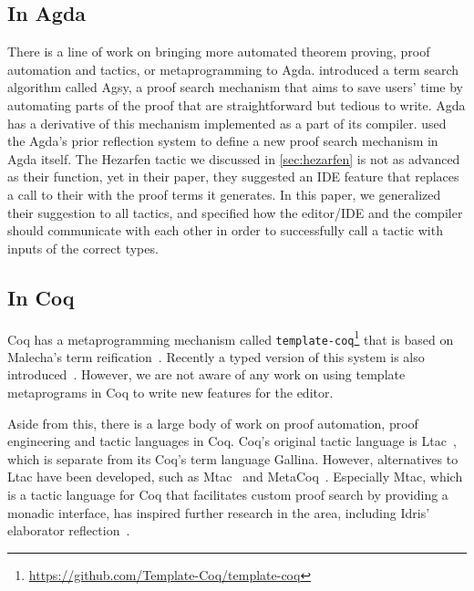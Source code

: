 \subsection{In Agda}

There is a line of work on bringing more automated theorem proving,
proof automation and tactics, or metaprogramming to Agda.
\citet{agsy} introduced a term search algorithm called
Agsy, a proof search mechanism that aims to save users' time by automating
parts of the proof that are straightforward but tedious to write.
Agda has a derivative of this mechanism implemented as a part of its compiler.
\citet{autoinagda} used the Agda's prior reflection system to define a
new proof search mechanism in Agda itself.
The Hezarfen tactic we discussed in \autoref{sec:hezarfen} is not as advanced
as their  function, yet in their paper, they suggested an IDE feature
that replaces a call to their  with the proof terms it generates.
In this paper, we generalized their suggestion to all tactics, and specified
how the editor/IDE and the compiler should communicate with each other
in order to successfully call a tactic with inputs of the correct types.

\subsection{In Coq}

Coq has a metaprogramming mechanism called
\texttt{template-coq}\footnote{\url{https://github.com/Template-Coq/template-coq}} that is based on
Malecha's term reification~\cite{malecha-phd}. Recently a typed
version of this system is also introduced~\cite{typed-template-coq}.
However, we are not aware of any work on using template metaprograms in Coq to
write new features for the editor.

Aside from this, there is a large body of work on proof automation, proof
engineering and tactic languages in Coq.  Coq's original tactic language is
Ltac~\cite{ltac}, which is separate from its Coq's term language Gallina.
However, alternatives to Ltac have been developed, such as Mtac~\cite{mtac} and
MetaCoq~\cite{metacoq}.  Especially Mtac, which is a tactic language
for Coq that facilitates custom proof search by providing a monadic interface,
has inspired further research in the area, including Idris' elaborator
reflection~\cite{elabref}.



